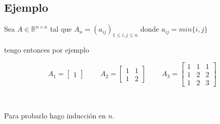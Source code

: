 \subsection{Ejemplo}\label{subsec:ejemplo_cholesky}

Sea $A \in \mathbb{R}^{n \times n}$  tal que $A_n = {(a_{ij})}_{1 \leq i,j \leq n}$ donde $a_{ij} = min\{i,j\}$

tengo entonces por ejemplo

\[
A_1 = 
\begin{bmatrix}
1
\end{bmatrix}
~~~~~~~~~~
A_2 =
\begin{bmatrix}
    1 & 1 \\
    1 & 2
\end{bmatrix}
~~~~~~~~~~
A_3 =
\begin{bmatrix}
    1 & 1 & 1 \\
    1 & 2 & 2 \\
    1 & 2 & 3
\end{bmatrix}
\]

\

Para probarlo hago inducción en $n$.


